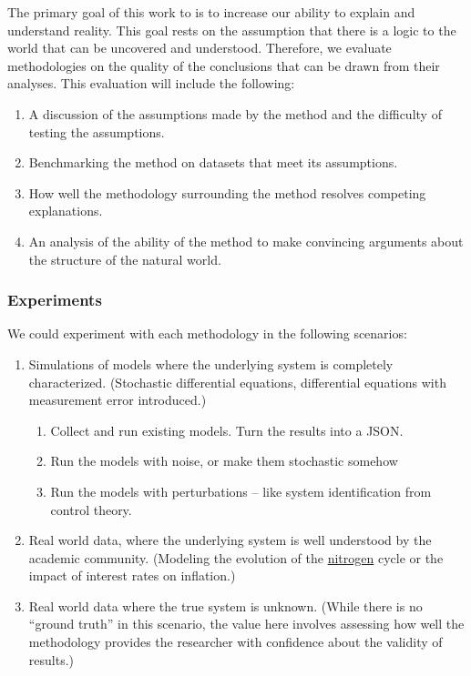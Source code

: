\documentclass{article}
\begin{document}
        The primary goal of this work to is to increase our ability to explain and understand reality. This goal rests on the
        assumption that there is a logic to the world that can be uncovered and understood. Therefore, we evaluate methodologies
        on the quality of the conclusions that can be drawn from their analyses. This evaluation will include the following:

        \begin{enumerate}
            \item A discussion of the assumptions made by the method and the difficulty of testing the assumptions.
            \item Benchmarking the method on datasets that meet its assumptions.
            \item How well the methodology surrounding the method resolves competing explanations.
            \item An analysis of the ability of the method to make convincing arguments about the structure of the natural world.
        \end{enumerate}

        \subsubsection*{Experiments}

            We could experiment with each methodology in the following scenarios:
            \begin{enumerate}
                \item Simulations of models where the underlying system is completely characterized. 
                (Stochastic differential equations, differential equations with measurement
                error introduced.)

                \begin{enumerate}
                    \item Collect and run existing models. Turn the results into a JSON.
                    \item Run the models with noise, or make them stochastic somehow
                    \item Run the models with perturbations -- like system identification
                    from control theory.
                \end{enumerate}

                \item Real world data, where the underlying system is well understood by the academic community.
                (Modeling the evolution of the \href{https://www.sciencedirect.com/science/article/pii/S0045653520316866}{nitrogen}
                cycle or the impact of interest rates on inflation.)

                \item Real world data where the true system is unknown. (While there is no ``ground truth''
                in this scenario, the value here involves assessing how well the methodology provides the
                researcher with confidence about the validity of results.)

            \end{enumerate}
\end{document}
